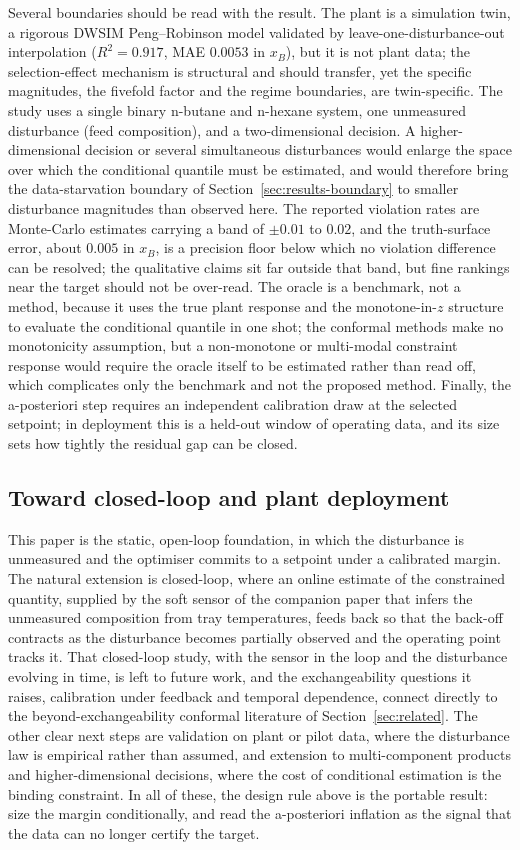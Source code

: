 \documentclass[review,times]{elsarticle}
\begin{document}
Several boundaries should be read with the result. The plant is a simulation twin, a rigorous
DWSIM Peng--Robinson model validated by leave-one-disturbance-out interpolation ($R^2=0.917$, MAE
$0.0053$ in $x_B$), but it is not plant data; the selection-effect mechanism is structural and
should transfer, yet the specific magnitudes, the fivefold factor and the regime boundaries, are
twin-specific. The study uses a single binary n-butane and n-hexane system, one unmeasured
disturbance (feed composition), and a two-dimensional decision. A higher-dimensional decision or
several simultaneous disturbances would enlarge the space over which the conditional quantile must
be estimated, and would therefore bring the data-starvation boundary of
Section~\ref{sec:results-boundary} to smaller disturbance magnitudes than observed here. The
reported violation rates are Monte-Carlo estimates carrying a band of $\pm0.01$ to $0.02$, and the
truth-surface error, about $0.005$ in $x_B$, is a precision floor below which no violation
difference can be resolved; the qualitative claims sit far outside that band, but fine rankings
near the target should not be over-read. The oracle is a benchmark, not a method, because it uses
the true plant response and the monotone-in-$z$ structure to evaluate the conditional quantile in
one shot; the conformal methods make no monotonicity assumption, but a non-monotone or multi-modal
constraint response would require the oracle itself to be estimated rather than read off, which
complicates only the benchmark and not the proposed method. Finally, the a-posteriori step
requires an independent calibration draw at the selected setpoint; in deployment this is a
held-out window of operating data, and its size sets how tightly the residual gap can be closed.

\subsection{Toward closed-loop and plant deployment}

This paper is the static, open-loop foundation, in which the disturbance is unmeasured and the
optimiser commits to a setpoint under a calibrated margin. The natural extension is closed-loop,
where an online estimate of the constrained quantity, supplied by the soft sensor of the companion
paper that infers the unmeasured composition from tray temperatures, feeds back so that the
back-off contracts as the disturbance becomes partially observed and the operating point tracks
it. That closed-loop study, with the sensor in the loop and the disturbance evolving in time, is
left to future work, and the exchangeability questions it raises, calibration under feedback and
temporal dependence, connect directly to the beyond-exchangeability conformal literature of
Section~\ref{sec:related}. The other clear next steps are validation on plant or pilot data, where
the disturbance law is empirical rather than assumed, and extension to multi-component products
and higher-dimensional decisions, where the cost of conditional estimation is the binding
constraint. In all of these, the design rule above is the portable result: size the margin
conditionally, and read the a-posteriori inflation as the signal that the data can no longer
certify the target.
\end{document}
